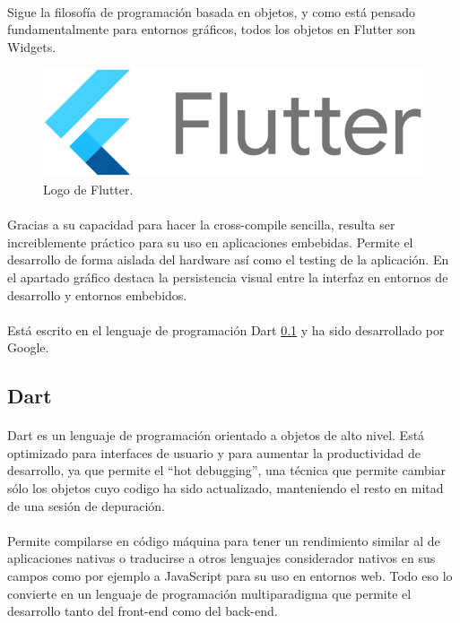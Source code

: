 \paragraph{} Sigue la filosofía de programación basada en objetos, y como está pensado
fundamentalmente para entornos gráficos, todos los objetos en Flutter son \gls{Widgets}.

\begin{figure}[h]
	\centering
	\includegraphics[width=0.50\linewidth]{imgs/flutter-logo}
	\caption[Flutter Logo]{Logo de Flutter.}
	\label{fig:flutter}
\end{figure}

\paragraph{} Gracias a su capacidad para hacer la \gls{cross-compile} sencilla, resulta
ser increiblemente práctico para su uso en aplicaciones embebidas. Permite el desarrollo
de forma aislada del hardware así como el testing de la aplicación. En el apartado
gráfico destaca la persistencia visual entre la interfaz en entornos de desarrollo y
entornos embebidos.

\paragraph{} Está escrito en el lenguaje de programación Dart \ref{sec:dart} y ha sido
desarrollado por Google.

\subsection{Dart}\label{sec:dart}

\paragraph{}Dart es un lenguaje de programación orientado a objetos de alto nivel.
Está optimizado para interfaces de usuario y para aumentar la productividad de desarrollo,
ya que permite el ``hot debugging'', una técnica que permite cambiar sólo los objetos cuyo
codigo ha sido actualizado, manteniendo el resto en mitad de una sesión de depuración.
\cite{dart}

\paragraph{}Permite compilarse en código máquina para tener un rendimiento similar al
de aplicaciones nativas o traducirse a otros lenguajes considerador nativos en sus campos
como por ejemplo a JavaScript para su uso en entornos web. Todo eso lo convierte en un
lenguaje de programación multiparadigma que permite el desarrollo tanto del \gls{front-end}
como del \gls{back-end}.

